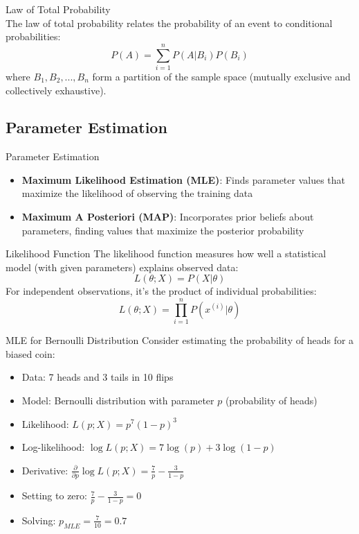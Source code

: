 \begin{concept}{Law of Total Probability}\\
The law of total probability relates the probability of an event to conditional probabilities:
\[P(A) = \sum_{i=1}^{n} P(A|B_i)P(B_i)\]
where $B_1, B_2, ..., B_n$ form a partition of the sample space (mutually exclusive and collectively exhaustive).
\end{concept}
\multend

\subsection{Parameter Estimation}


\begin{definition}{Parameter Estimation}
\begin{itemize}
    \item \textbf{Maximum Likelihood Estimation (MLE)}: Finds parameter values that maximize the likelihood of observing the training data
    \item \textbf{Maximum A Posteriori (MAP)}: Incorporates prior beliefs about parameters, finding values that maximize the posterior probability
\end{itemize}
\end{definition}


\begin{definition}{Likelihood Function}
The likelihood function measures how well a statistical model (with given parameters) explains observed data:
\[L(\theta; X) = P(X|\theta)\]
For independent observations, it's the product of individual probabilities:
\[L(\theta; X) = \prod_{i=1}^{n} P(x^{(i)}|\theta)\]
\end{definition}

\begin{example}{MLE for Bernoulli Distribution}
Consider estimating the probability of heads for a biased coin:
\begin{itemize}
    \item Data: 7 heads and 3 tails in 10 flips
    \item Model: Bernoulli distribution with parameter $p$ (probability of heads)
    \item Likelihood: $L(p; X) = p^7 (1-p)^3$
    \item Log-likelihood: $\log L(p; X) = 7\log(p) + 3\log(1-p)$
    \item Derivative: $\frac{\partial}{\partial p} \log L(p; X) = \frac{7}{p} - \frac{3}{1-p}$
    \item Setting to zero: $\frac{7}{p} - \frac{3}{1-p} = 0$
    \item Solving: $p_{MLE} = \frac{7}{10} = 0.7$
\end{itemize}
\end{example}

